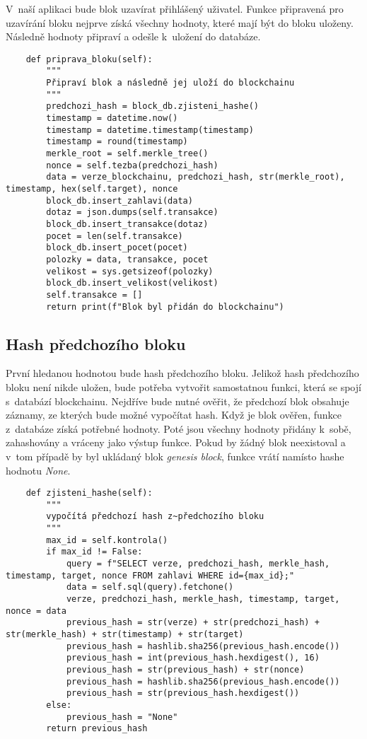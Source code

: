 \documentclass[12pt]{report}			%
\begin{document}
{{V~naší aplikaci bude blok uzavírat přihlášený uživatel. Funkce připravená pro uzavírání bloku nejprve získá všechny hodnoty, které mají být do bloku uloženy. Následně hodnoty připraví a odešle k~uložení do databáze.
}
\begin{lstlisting} 
	def priprava_bloku(self):
        """
        Připraví blok a následně jej uloží do blockchainu
        """
        predchozi_hash = block_db.zjisteni_hashe()
        timestamp = datetime.now()
        timestamp = datetime.timestamp(timestamp)
        timestamp = round(timestamp)
        merkle_root = self.merkle_tree()
        nonce = self.tezba(predchozi_hash)
        data = verze_blockchainu, predchozi_hash, str(merkle_root), timestamp, hex(self.target), nonce
        block_db.insert_zahlavi(data)
        dotaz = json.dumps(self.transakce)
        block_db.insert_transakce(dotaz)
        pocet = len(self.transakce)
        block_db.insert_pocet(pocet)
        polozky = data, transakce, pocet
        velikost = sys.getsizeof(polozky)
        block_db.insert_velikost(velikost)
        self.transakce = []
        return print(f"Blok byl přidán do blockchainu")
\end{lstlisting}
	\subsection{Hash předchozího bloku}{
První hledanou hodnotou bude hash předchozího bloku. Jelikož hash předchozího bloku není nikde uložen, bude potřeba vytvořit samostatnou funkci, která se spojí s~databází blockchainu. Nejdříve bude nutné ověřit, že předchozí blok obsahuje záznamy, ze kterých bude možné vypočítat hash. Když je blok ověřen, funkce z~databáze získá potřebné hodnoty. Poté jsou všechny hodnoty přidány k~sobě, zahashovány a vráceny jako výstup funkce. Pokud by žádný blok neexistoval a v~tom případě by byl ukládaný blok \textit{genesis block}, funkce vrátí namísto hashe hodnotu \textit{None}.\begin{lstlisting}
	def zjisteni_hashe(self):
        """
        vypočítá předchozí hash z~předchozího bloku
        """
        max_id = self.kontrola()
        if max_id != False:
            query = f"SELECT verze, predchozi_hash, merkle_hash, timestamp, target, nonce FROM zahlavi WHERE id={max_id};"
            data = self.sql(query).fetchone()
            verze, predchozi_hash, merkle_hash, timestamp, target, nonce = data
            previous_hash = str(verze) + str(predchozi_hash) + str(merkle_hash) + str(timestamp) + str(target)
            previous_hash = hashlib.sha256(previous_hash.encode())
            previous_hash = int(previous_hash.hexdigest(), 16)
            previous_hash = str(previous_hash) + str(nonce)
            previous_hash = hashlib.sha256(previous_hash.encode())
            previous_hash = str(previous_hash.hexdigest())
        else: 
            previous_hash = "None"
        return previous_hash 
\end{lstlisting}
}
}
\end{document}
